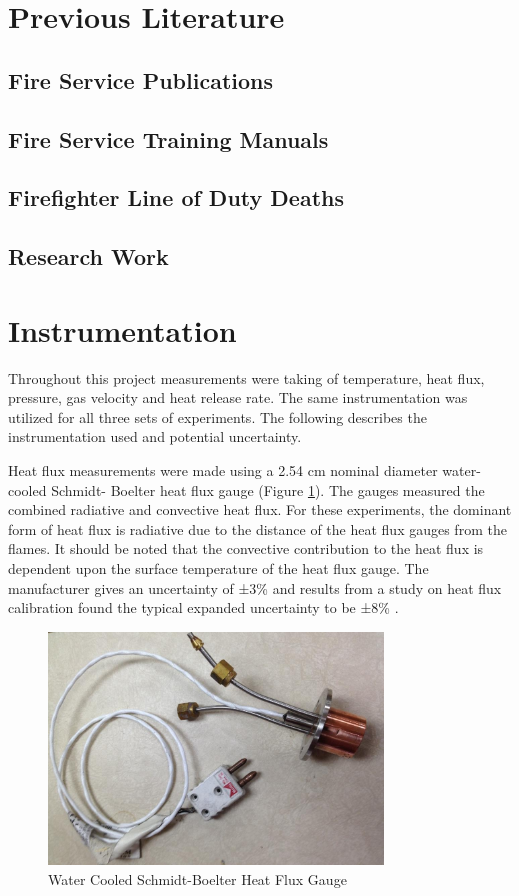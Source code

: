 \documentclass{article}
\begin{document}
\section{Previous Literature}
\subsection{Fire Service Publications}
\subsection{Fire Service Training Manuals}
\subsection{Firefighter Line of Duty Deaths}
\subsection{Research Work}

\section{Instrumentation}
Throughout this project measurements were taking of temperature, heat flux, pressure, gas velocity and heat release rate. The same instrumentation was utilized for all three sets of experiments. The following describes the instrumentation used and potential uncertainty.

Heat flux measurements were made using a 2.54 cm nominal diameter water-cooled Schmidt- Boelter heat flux gauge (Figure \ref{fig:HeatFluxGauge}). The gauges measured the combined radiative and convective heat flux. For these experiments, the dominant form of heat flux is radiative due to the distance of the heat flux gauges from the flames. It should be noted that the convective contribution to the heat flux is dependent upon the surface temperature of the heat flux gauge. The manufacturer gives an uncertainty of ±3\% and results from a study on heat flux calibration found the typical expanded uncertainty to be ±8\% \cite{HeatFluxRoundRobin}.

\begin{figure} [H]
	\centering
	\includegraphics[width = 3.5in]{0_Images/Instrumentation/Heat_Flux_Gauge.jpg}
	\caption{Water Cooled Schmidt-Boelter Heat Flux Gauge}
	\label{fig:HeatFluxGauge}
\end{figure}
\end{document}
